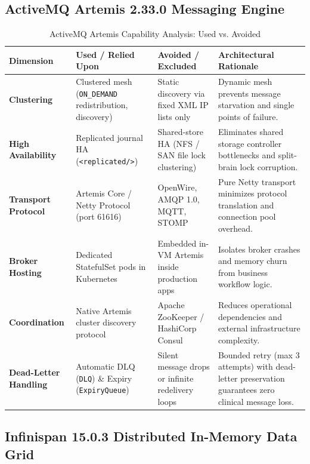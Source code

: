 \subsection{ActiveMQ Artemis 2.33.0 Messaging Engine}

\begin{table}[htbp]
\centering
\scriptsize
\begin{tabularx}{\textwidth}{P{3.0cm} P{3.8cm} P{3.8cm} Y}
\toprule
\textbf{Dimension} & \textbf{Used / Relied Upon} & \textbf{Avoided / Excluded} & \textbf{Architectural Rationale} \\
\midrule
\textbf{Clustering} & Clustered mesh (\nolinkurl{ON_DEMAND} redistribution, discovery) & Static discovery via fixed XML IP lists only & Dynamic mesh prevents message starvation and single points of failure. \\
\addlinespace
\textbf{High Availability} & Replicated journal HA (\nolinkurl{<replicated/>}) & Shared-store HA (NFS / SAN file lock clustering) & Eliminates shared storage controller bottlenecks and split-brain lock corruption. \\
\addlinespace
\textbf{Transport Protocol} & Artemis Core / Netty Protocol (port 61616) & OpenWire, AMQP 1.0, MQTT, STOMP & Pure Netty transport minimizes protocol translation and connection pool overhead. \\
\addlinespace
\textbf{Broker Hosting} & Dedicated StatefulSet pods in Kubernetes & Embedded in-VM Artemis inside production apps & Isolates broker crashes and memory churn from business workflow logic. \\
\addlinespace
\textbf{Coordination} & Native Artemis cluster discovery protocol & Apache ZooKeeper / HashiCorp Consul & Reduces operational dependencies and external infrastructure complexity. \\
\addlinespace
\textbf{Dead-Letter Handling} & Automatic DLQ (\nolinkurl{DLQ}) \& Expiry (\nolinkurl{ExpiryQueue}) & Silent message drops or infinite redelivery loops & Bounded retry (max 3 attempts) with dead-letter preservation guarantees zero clinical message loss. \\
\bottomrule
\end{tabularx}
\caption{ActiveMQ Artemis Capability Analysis: Used vs. Avoided}
\label{tab:artemis_used_vs_avoided}
\end{table}

\subsection{Infinispan 15.0.3 Distributed In-Memory Data Grid}

